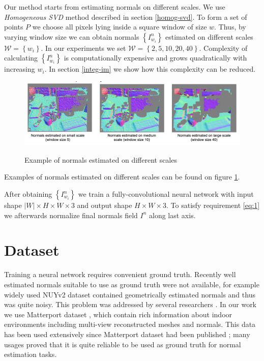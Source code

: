 Our method starts from estimating normals on different scales. We use \textit{Homogeneous SVD} method described in section \ref{homog-svd}. To form a set of points $P$ we choose all pixels lying inside a square window of size $w$. Thus, by varying window size we can obtain normals $\left\{I^n_{w_i}\right\}$ estimated on different scales $\mathcal{W} = \left\{w_i\right\}$. In our experiments we set $\mathcal{W} = \left\{2, 5, 10, 20, 40\right\}$. Complexity of calculating $\left\{I^n_{w_i}\right\}$ is computationally expensive and grows quadratically with increasing  $w_i$. In section \ref{integ-im} we show how this complexity can be reduced.

\begin{figure}
\caption{Example of normals estimated on different scales}
\centering
\includegraphics[width=\textwidth]{images/Screen Shot 2020-05-27 at 7.43.01 PM.png}
\label{fig:diff_scales}
\end{figure}

Examples of normals estimated on different scales can be found on figure \ref{fig:diff_scales}.

After obtaining $\left\{I^n_{w_i}\right\}$ we train a fully-convolutional neural network with input shape $\left|W\right| \times H \times W \times 3$ and output shape $H \times W \times 3$. To satisfy requirement \ref{eq:1} we afterwards normalize final normals field $I^n$ along last axis.

\section{Dataset}

Training a neural network requires convenient ground truth. Recently well estimated normals suitable to use as ground truth were not available, for example widely used NUYv2 dataset contained geometrically estimated normals and thus was quite noisy. This problem was addressed by several researchers \cite{matterport, physically-based-rendering}. In our work we use Matterport dataset \cite{matterport}, which contain rich information about indoor environments including multi-view reconstructed meshes and normals. This data has been used extensively since Matterport dataset had been published \cite{deep_surf, deep_depth_compl}; many usages proved that it is quite reliable to be used as ground truth for normal estimation tasks.

